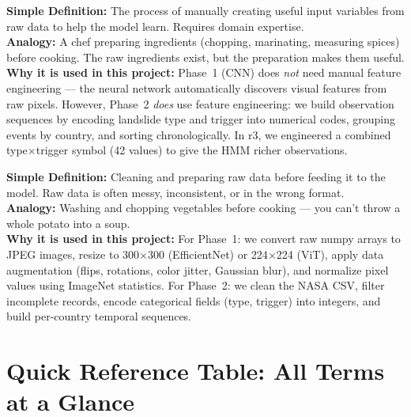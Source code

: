 \documentclass[11pt]{article}
\begin{document}
\begin{description}[style=nextline, leftmargin=1.5cm]
    \item[\textbf{Feature Engineering}]
    \textbf{Simple Definition:} The process of manually creating useful input variables from raw data to help the model learn. Requires domain expertise.\\
    \textbf{Analogy:} A chef preparing ingredients (chopping, marinating, measuring spices) before cooking. The raw ingredients exist, but the preparation makes them useful.\\
    \textbf{Why it is used in this project:} Phase~1 (CNN) does \emph{not} need manual feature engineering --- the neural network automatically discovers visual features from raw pixels. However, Phase~2 \emph{does} use feature engineering: we build observation sequences by encoding landslide type and trigger into numerical codes, grouping events by country, and sorting chronologically. In r3, we engineered a combined type$\times$trigger symbol (42 values) to give the HMM richer observations.

    \item[\textbf{Preprocessing}]
    \textbf{Simple Definition:} Cleaning and preparing raw data before feeding it to the model. Raw data is often messy, inconsistent, or in the wrong format.\\
    \textbf{Analogy:} Washing and chopping vegetables before cooking --- you can't throw a whole potato into a soup.\\
    \textbf{Why it is used in this project:} For Phase~1: we convert raw numpy arrays to JPEG images, resize to 300$\times$300 (EfficientNet) or 224$\times$224 (ViT), apply data augmentation (flips, rotations, color jitter, Gaussian blur), and normalize pixel values using ImageNet statistics. For Phase~2: we clean the NASA CSV, filter incomplete records, encode categorical fields (type, trigger) into integers, and build per-country temporal sequences.

\end{description}

\newpage
\section{Quick Reference Table: All Terms at a Glance}
\end{document}
